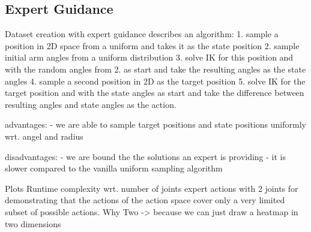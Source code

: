 \subsection{Expert Guidance}

Dataset creation with expert guidance describes an algorithm:
    1. sample a position in 2D space from a uniform and takes it as the state position
    2. sample initial arm angles from a uniform distribution
    3. solve IK for this position and with the random angles from 2. as start and take the resulting angles as the state angles
    4. sample a second position in 2D as the target position
    5. solve IK for the target position and with the state angles as start and take the difference between resulting angles and state angles as the action.

advantages:
    - we are able to sample target positions and state positions uniformly wrt. angel and radius

disadvantages:
    - we are bound the the solutions an expert is providing
    - it is slower compared to the vanilla uniform sampling algorithm

Plots
    Runtime complexity wrt. number of joints
    expert actions with 2 joints for demonstrating that the actions of the action space cover only a very limited subset of possible actions. Why Two -> because we can just draw a heatmap in two dimensions


\sectioon
